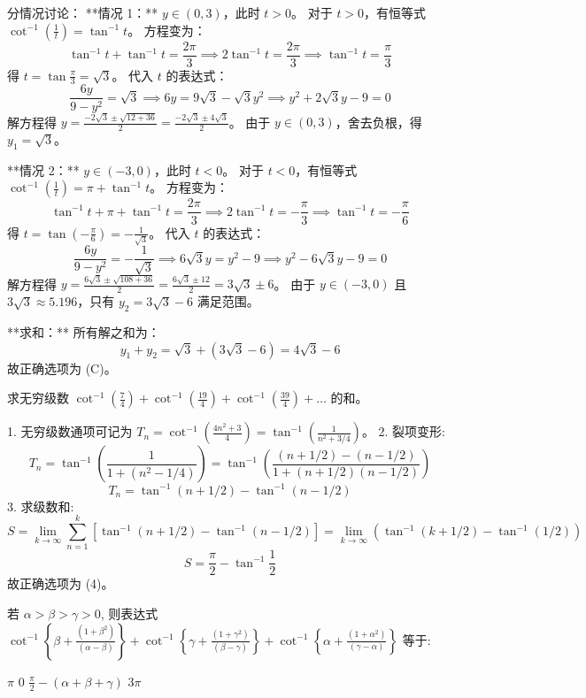 \begin{questions}
\begin{solution}
分情况讨论：
**情况 1：** $y \in (0, 3)$，此时 $t > 0$。
对于 $t > 0$，有恒等式 $\cot^{-1} \left( \frac{1}{t} \right) = \tan^{-1} t$。
方程变为：
\[
\tan^{-1} t + \tan^{-1} t = \frac{2\pi}{3} \implies 2\tan^{-1} t = \frac{2\pi}{3} \implies \tan^{-1} t = \frac{\pi}{3}
\]
得 $t = \tan \frac{\pi}{3} = \sqrt{3}$。
代入 $t$ 的表达式：
\[
\frac{6y}{9-y^2} = \sqrt{3} \implies 6y = 9\sqrt{3} - \sqrt{3}y^2 \implies y^2 + 2\sqrt{3}y - 9 = 0
\]
解方程得 $y = \frac{-2\sqrt{3} \pm \sqrt{12 + 36}}{2} = \frac{-2\sqrt{3} \pm 4\sqrt{3}}{2}$。
由于 $y \in (0, 3)$，舍去负根，得 $y_1 = \sqrt{3}$。

**情况 2：** $y \in (-3, 0)$，此时 $t < 0$。
对于 $t < 0$，有恒等式 $\cot^{-1} \left( \frac{1}{t} \right) = \pi + \tan^{-1} t$。
方程变为：
\[
\tan^{-1} t + \pi + \tan^{-1} t = \frac{2\pi}{3} \implies 2\tan^{-1} t = -\frac{\pi}{3} \implies \tan^{-1} t = -\frac{\pi}{6}
\]
得 $t = \tan \left( -\frac{\pi}{6} \right) = -\frac{1}{\sqrt{3}}$。
代入 $t$ 的表达式：
\[
\frac{6y}{9-y^2} = -\frac{1}{\sqrt{3}} \implies 6\sqrt{3}y = y^2 - 9 \implies y^2 - 6\sqrt{3}y - 9 = 0
\]
解方程得 $y = \frac{6\sqrt{3} \pm \sqrt{108 + 36}}{2} = \frac{6\sqrt{3} \pm 12}{2} = 3\sqrt{3} \pm 6$。
由于 $y \in (-3, 0)$ 且 $3\sqrt{3} \approx 5.196$，只有 $y_2 = 3\sqrt{3} - 6$ 满足范围。

**求和：**
所有解之和为：
\[
y_1 + y_2 = \sqrt{3} + (3\sqrt{3} - 6) = 4\sqrt{3} - 6
\]
故正确选项为 (C)。
\end{solution}

\question
求无穷级数 $\cot^{-1}(\frac{7}{4}) + \cot^{-1}(\frac{19}{4}) + \cot^{-1}(\frac{39}{4}) + \dots$ 的和。

\begin{solution}
1. 无穷级数通项可记为 $T_n = \cot^{-1}(\frac{4n^2 + 3}{4}) = \tan^{-1}(\frac{1}{n^2 + 3/4})$。
2. 裂项变形:
\[ T_n = \tan^{-1}\left(\frac{1}{1 + (n^2 - 1/4)}\right) = \tan^{-1}\left(\frac{(n+1/2) - (n-1/2)}{1 + (n+1/2)(n-1/2)}\right) \]
\[ T_n = \tan^{-1}(n + 1/2) - \tan^{-1}(n - 1/2) \]
3. 求级数和:
\[ S = \lim_{k \to \infty} \sum_{n=1}^k [ \tan^{-1}(n+1/2) - \tan^{-1}(n-1/2) ] = \lim_{k \to \infty} (\tan^{-1}(k+1/2) - \tan^{-1}(1/2)) \]
\[ S = \frac{\pi}{2} - \tan^{-1} \frac{1}{2} \]
故正确选项为 (4)。
\end{solution}

\question
若 $\alpha > \beta > \gamma > 0$, 则表达式 $\cot^{-1} \left\{ \beta + \frac{(1+\beta^2)}{(\alpha-\beta)} \right\} + \cot^{-1} \left\{ \gamma + \frac{(1+\gamma^2)}{(\beta-\gamma)} \right\} + \cot^{-1} \left\{ \alpha + \frac{(1+\alpha^2)}{(\gamma-\alpha)} \right\}$ 等于:
\begin{choices}
    \choice $\pi$
    \choice $0$
    \choice $\frac{\pi}{2} - (\alpha + \beta + \gamma)$
    \choice $3\pi$
\end{choices}


\end{questions}

